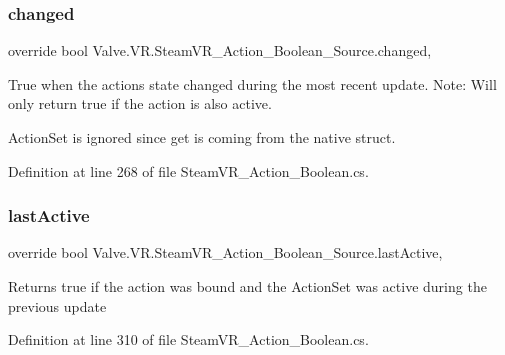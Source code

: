 \subsubsection{\texorpdfstring{changed}{changed}}
{\footnotesize\ttfamily override bool Valve.\+V\+R.\+Steam\+V\+R\+\_\+\+Action\+\_\+\+Boolean\+\_\+\+Source.\+changed\hspace{0.3cm}{\ttfamily [get]}, {}}



True when the action\textquotesingle{}s state changed during the most recent update. Note\+: Will only return true if the action is also active. 

Action\+Set is ignored since get is coming from the native struct.

Definition at line 268 of file Steam\+V\+R\+\_\+\+Action\+\_\+\+Boolean.\+cs.

\mbox{\label{class_valve_1_1_v_r_1_1_steam_v_r___action___boolean___source_a797a1d5c573add8358c04e40de6151e6}} 
\subsubsection{\texorpdfstring{lastActive}{lastActive}}
{\footnotesize\ttfamily override bool Valve.\+V\+R.\+Steam\+V\+R\+\_\+\+Action\+\_\+\+Boolean\+\_\+\+Source.\+last\+Active\hspace{0.3cm}{\ttfamily [get]}, {}}



Returns true if the action was bound and the Action\+Set was active during the previous update 



Definition at line 310 of file Steam\+V\+R\+\_\+\+Action\+\_\+\+Boolean.\+cs.

\mbox{\label{class_valve_1_1_v_r_1_1_steam_v_r___action___boolean___source_a818becad695a366d83859d897240c88d}} 
